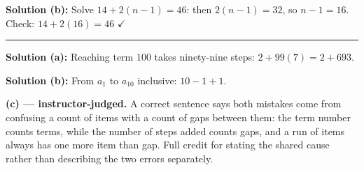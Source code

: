 \documentclass[12pt]{article}
\begin{document}
\textbf{Solution (b):} Solve $14 + 2(n-1) = 46$: then $2(n-1) = 32$, so $n - 1 = 16$. Check: $14 + 2(16) = 46$ $\checkmark$ 

\vspace{0.2cm}\noindent\rule{\linewidth}{0.2pt}


\textbf{Solution (a):} Reaching term $100$ takes ninety-nine steps: $2 + 99(7) = 2 + 693$. 

\textbf{Solution (b):} From $a_1$ to $a_{10}$ inclusive: $10 - 1 + 1$. 

\textbf{(c) --- instructor-judged.} A correct sentence says both mistakes come from confusing a count of items with a count of gaps between them: the term number counts terms, while the number of steps added counts gaps, and a run of items always has one more item than gap. Full credit for stating the shared cause rather than describing the two errors separately.
\end{document}
